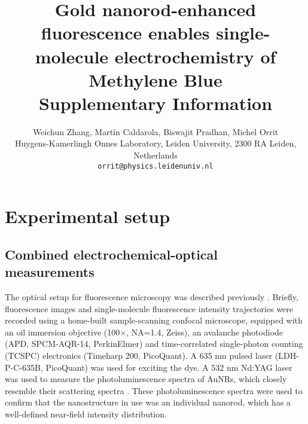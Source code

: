 \documentclass[11pt,a4paper,onecolumn]{article}
\newcommand*{\affaddr}[1]{#1} %
\newcommand*{\email}[1]{\texttt{#1}} %
\begin{document}
\author{
Weichun Zhang, Mart\'in Caldarola, Biswajit Pradhan, Michel Orrit\\\affaddr{Huygens-Kamerlingh Onnes Laboratory, Leiden University, 2300 RA Leiden, Netherlands}\\\email{orrit@physics.leidenuniv.nl}
}

\date{\vspace{1ex}} %
\title{\textbf{Gold nanorod-enhanced fluorescence enables single-molecule electrochemistry of Methylene Blue}\\ \vspace{3ex} Supplementary Information \vspace{3ex}}
\maketitle
\tableofcontents
\pagebreak
%
\section{Experimental setup}

\subsection{Combined electrochemical-optical measurements}

The optical setup for fluorescence microscopy was described previously \cite{Pradhan2016EFCS}. Briefly, fluorescence images and single-molecule fluorescence intensity trajectories were recorded using a home-built sample-scanning confocal microscope, %
equipped with an oil immersion objective (100\(\times\), NA=1.4, Zeiss), an avalanche photodiode (APD, SPCM-AQR-14, PerkinElmer) and time-correlated single-photon counting (TCSPC) electronics (Timeharp 200, PicoQuant). A 635 nm pulsed laser (LDH-P-C-635B, PicoQuant) was used for exciting the dye. %
A 532 nm Nd:YAG laser %
 was used to measure the photoluminescence spectra of AuNRs, which closely resemble their scattering spectra \cite{Mustafa_NRQY}. These photoluminescence spectra were used to confirm that the nanostructure in use was an individual nanorod, which has a well-defined near-field intensity distribution.
\end{document}
